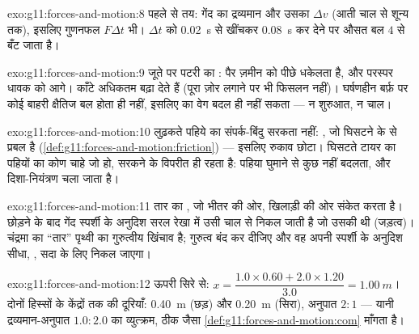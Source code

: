 \begin{solution}{exo:g11:forces-and-motion:8}
पहले से तय: गेंद का द्रव्यमान और उसका $\Delta v$ (आती चाल से शून्य तक), इसलिए
गुणनफल $F\Delta t$ भी। $\Delta t$ को \qty{0.02}{s} से खींचकर \qty{0.08}{s} कर देने पर औसत
बल $4$ से बँट जाता है।
\end{solution}

\begin{solution}{exo:g11:forces-and-motion:9}
जूते पर पटरी का : पैर ज़मीन को पीछे धकेलता है, और
परस्पर  धावक को आगे। काँटे अधिकतम 
बढ़ा देते हैं (पूरा ज़ोर लगाने पर भी फिसलन नहीं)। घर्षणहीन बर्फ़ पर कोई बाहरी
क्षैतिज बल होता ही नहीं, इसलिए  का वेग बदल
ही नहीं सकता --- न शुरुआत, न चाल।
\end{solution}

\begin{solution}{exo:g11:forces-and-motion:10}
लुढ़कते पहिये का संपर्क-बिंदु सरकता नहीं: , जो घिसटने के
 से प्रबल है (\cref{def:g11:forces-and-motion:friction}) --- इसलिए रुकाव छोटा। घिसटते टायर का
 पहियों का कोण चाहे जो हो, सरकने के विपरीत ही रहता है:
पहिया घुमाने से कुछ नहीं बदलता, और दिशा-नियंत्रण चला जाता है।
\end{solution}

\begin{solution}{exo:g11:forces-and-motion:11}
तार का , जो भीतर की ओर, खिलाड़ी की ओर संकेत करता है। छोड़ने के
बाद गेंद स्पर्शी के अनुदिश सरल रेखा में उसी चाल से निकल जाती है जो उसकी थी
(जड़त्व)। चंद्रमा का ``तार'' पृथ्वी का गुरुत्वीय खिंचाव है; गुरुत्व बंद कर
दीजिए और वह अपनी स्पर्शी के अनुदिश सीधा, , सदा के लिए निकल जाएगा।
\end{solution}

\begin{solution}{exo:g11:forces-and-motion:12}
ऊपरी सिरे से: $x = \dfrac{1.0 \times 0.60 + 2.0 \times 1.20}{3.0}
= \qty{1.00}{m}$। दोनों हिस्सों के केंद्रों तक की दूरियाँ: \qty{0.40}{m} (छड़)
और \qty{0.20}{m} (सिरा), अनुपात $2 : 1$ --- यानी द्रव्यमान-अनुपात $1.0 : 2.0$ का
व्युत्क्रम, ठीक जैसा \cref{def:g11:forces-and-motion:com} माँगता है।
\end{solution}

